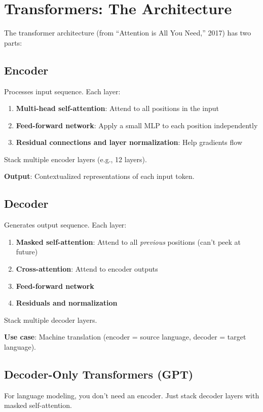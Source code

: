 \documentclass[11pt,oneside]{book}
\begin{document}
\section{Transformers: The Architecture}

The transformer architecture (from ``Attention is All You Need,'' 2017) has two parts:

\subsection{Encoder}
Processes input sequence. Each layer:
\begin{enumerate}
\item \textbf{Multi-head self-attention}: Attend to all positions in the input
\item \textbf{Feed-forward network}: Apply a small MLP to each position independently
\item \textbf{Residual connections and layer normalization}: Help gradients flow
\end{enumerate}

Stack multiple encoder layers (e.g., 12 layers).

\textbf{Output}: Contextualized representations of each input token.

\subsection{Decoder}
Generates output sequence. Each layer:
\begin{enumerate}
\item \textbf{Masked self-attention}: Attend to all \textit{previous} positions (can't peek at future)
\item \textbf{Cross-attention}: Attend to encoder outputs
\item \textbf{Feed-forward network}
\item \textbf{Residuals and normalization}
\end{enumerate}

Stack multiple decoder layers.

\textbf{Use case}: Machine translation (encoder = source language, decoder = target language).

\subsection{Decoder-Only Transformers (GPT)}

For language modeling, you don't need an encoder. Just stack decoder layers with masked self-attention.
\end{document}
